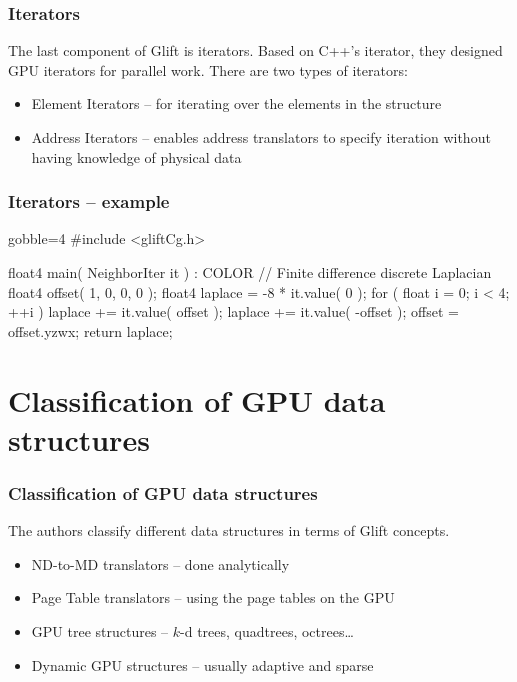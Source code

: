 \documentclass[xcolor={usenames,dvipsnames}]{beamer}
\begin{document}
\begin{frame}
  \frametitle{Iterators}

  The last component of Glift is iterators. Based on C++'s iterator, they
  designed GPU iterators for parallel work. There are two types of iterators:
  \begin{itemize}
  \item<2-> Element Iterators -- for iterating over the elements in the
    structure
  \item<3-> Address Iterators -- enables address translators to specify
    iteration without having knowledge of physical data
  \end{itemize}
\end{frame}

\begin{frame}[fragile]
  \frametitle{Iterators -- example}
  \begin{ccode*}{gobble=4}
    #include <gliftCg.h>

    float4 main( NeighborIter it ) : COLOR
    {
      // Finite difference discrete Laplacian
      float4 offset( 1, 0, 0, 0 );
      float4 laplace = -8 * it.value( 0 );
      for ( float i = 0; i < 4; ++i ) {
        laplace += it.value( offset );
        laplace += it.value( -offset );
        offset = offset.yzwx;
      }
      return laplace;
    }
  \end{ccode*}
\end{frame}

\section{Classification of GPU data structures}
\begin{frame}
  \frametitle{Classification of GPU data structures}

  The authors classify different data structures in terms of Glift concepts.
  \begin{itemize}
  \item<2-> ND-to-MD translators -- done analytically
  \item<3-> Page Table translators -- using the page tables on the GPU
  \item<4-> GPU tree structures -- $k$-d trees, quadtrees, octrees\ldots
  \item<5-> Dynamic GPU structures -- usually adaptive and sparse
  \end{itemize}
\end{frame}
\end{document}
